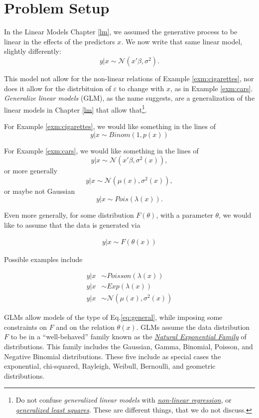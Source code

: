 \documentclass[]{book}
\theoremstyle{definition}
\theoremstyle{definition}
\theoremstyle{definition}
\theoremstyle{remark}
\begin{document}
\section{Problem Setup}\label{problem-setup-1}

In the Linear Models Chapter \ref{lm}, we assumed the generative process
to be linear in the effects of the predictors \(x\). We now write that
same linear model, slightly differently: \[
 y|x \sim \mathcal{N}(x'\beta, \sigma^2).
\]

This model not allow for the non-linear relations of Example
\ref{exm:cigarettes}, nor does it allow for the distrbituion of
\(\varepsilon\) to change with \(x\), as in Example \ref{exm:cars}.
\emph{Generalize linear models} (GLM), as the name suggests, are a
generalization of the linear models in Chapter \ref{lm} that allow
that\footnote{Do not confuse \emph{generalized linear models} with
  \href{https://en.wikipedia.org/wiki/Nonlinear_regression}{\emph{non-linear
  regression}}, or
  \href{https://en.wikipedia.org/wiki/Generalized_least_squares}{\emph{generalized
  least squares}}. These are different things, that we do not discuss.}.

For Example \ref{exm:cigarettes}, we would like something in the lines
of \[
 y|x \sim Binom(1,p(x))
\]

For Example \ref{exm:cars}, we would like something in the lines of \[
 y|x \sim \mathcal{N}(x'\beta,\sigma^2(x)),
\] or more generally \[
 y|x \sim \mathcal{N}(\mu(x),\sigma^2(x)),
\] or maybe not Gaussian \[
 y|x \sim Pois(\lambda(x)).
\]

Even more generally, for some distribution \(F(\theta)\), with a
parameter \(\theta\), we would like to assume that the data is generated
via

\begin{align}
  \label{eq:general}
  y|x \sim F(\theta(x))
\end{align}

Possible examples include

\begin{align}
 y|x &\sim Poisson(\lambda(x)) \\
 y|x &\sim Exp(\lambda(x)) \\
 y|x &\sim \mathcal{N}(\mu(x),\sigma^2(x)) 
\end{align}

GLMs allow models of the type of Eq.\eqref{eq:general}, while imposing
some constraints on \(F\) and on the relation \(\theta(x)\). GLMs assume
the data distribution \(F\) to be in a ``well-behaved'' family known as
the
\href{https://en.wikipedia.org/wiki/Natural_exponential_family}{\emph{Natural
Exponential Family}} of distributions. This family includes the
Gaussian, Gamma, Binomial, Poisson, and Negative Binomial distributions.
These five include as special cases the exponential, chi-squared,
Rayleigh, Weibull, Bernoulli, and geometric distributions.
\end{document}
